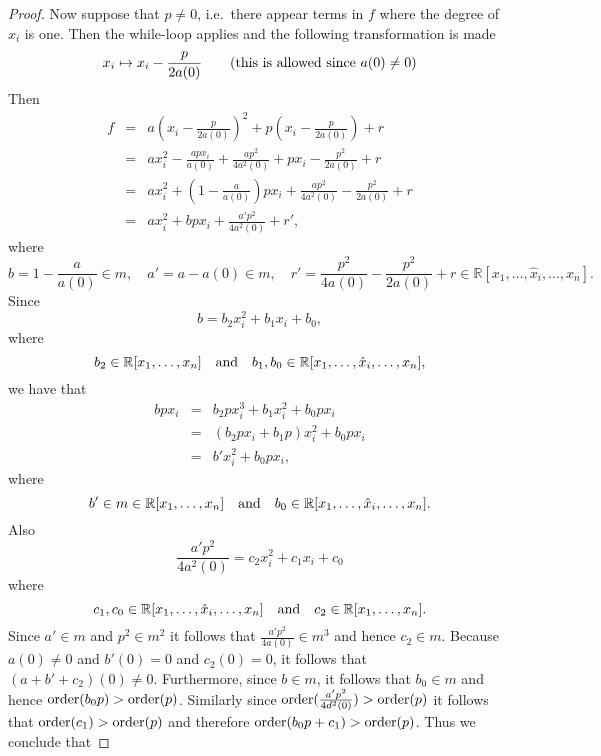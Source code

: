 \documentclass{amsproc}
\begin{document}
\begin{proof}
Now suppose that $p\neq 0$, i.e.~there appear terms in $f$ where the degree of $x_i$ is one. Then the while-loop applies and the following transformation is made 
\begin{equation}\label{eq3}
x_i\mapsto x_i-\frac{p}{2a(0)}\qquad
(\textnormal{this is allowed since }a(0)\neq 0)
\end{equation}
Then
\begin{eqnarray*}
f&=&a(x_i-\frac{p}{2a(0)})^2+p(x_i-\frac{p}{2a(0)})+r\\
&=&ax_i^2-\frac{apx_i}{a(0)}+\frac{ap^2}{4a^2(0)}+px_i-\frac{p^2}{2a(0)}+r\\
&=&ax_i^2+(1-\frac{a}{a(0)})px_i+\frac{ap^2}{4a^2(0)}-\frac{p^2}{2a(0)}+r\\
&=&ax_i^2+bpx_i+\frac{a'p^2}{4a^2(0)}+r',
\end{eqnarray*}
where 
\begin{equation*}
b=1-\frac{a}{a(0)}\in m,\quad a'=a-a(0)\in m,\quad r'=\frac{p^2}{4a(0)}-\frac{p^2}{2a(0)}+r\in\mathbb R[x_1,\ldots,\hat x_i,\ldots,x_n].
\end{equation*}
Since 
\begin{equation*}
b=b_2x_i^2+b_1x_i+b_0,
\end{equation*}
where
\begin{equation*}
b_2\in\mathbb R[x_1,\ldots,x_n] \quad\textnormal{and}\quad b_1,b_0\in\mathbb R[x_1,\ldots,\hat x_i,\ldots,x_n],
\end{equation*}
we have that 
\begin{eqnarray*}
bpx_i&=&b_2px_i^3+b_1x_i^2+b_0px_i\\
&=&(b_2px_i+b_1p)x_i^2+b_0px_i\\
&=&b'x_i^2+b_0px_i,
\end{eqnarray*}
where
\begin{equation*}
b'\in m\in\mathbb R[x_1,\ldots,x_n]\quad\textnormal{and}\quad b_0\in\mathbb R[x_1,\ldots,\hat x_i,\ldots,x_n]. 
\end{equation*}
Also
\begin{equation*}
\frac{a'p^2}{4a^2(0)}=c_2x_i^2+c_1x_i+c_0
\end{equation*}
where
\begin{equation*}
c_1,c_0\in\mathbb R[x_1,\ldots,\hat x_i,\ldots,x_n]\quad\textnormal{and}\quad c_2\in\mathbb R[x_1,\ldots,x_n].
\end{equation*}
Since $a'\in m$ and $p^2\in m^2$ it follows that $\frac{a'p^2}{4a(0)}\in m^3$
and hence $c_2\in m$. Because $a(0)\neq 0$ and $b'(0)=0$ and $c_2(0)=0$, it
follows that $(a+b'+c_2)(0)\neq 0$. Furthermore, since $b\in m$, it follows that $b_0\in m$ and hence $\textnormal{order}(b_0p)>\textnormal{order}(p)$. Similarly since $\textnormal{order}(\frac{a'p^2}{4d^2(0)})>\textnormal{order}(p)$ it follows that $\textnormal{order}(c_1)>\textnormal{order}(p)$ and therefore $\textnormal{order}(b_0p+c_1)>\textnormal{order}(p)$. Thus we conclude that

\end{proof}
\end{document}
